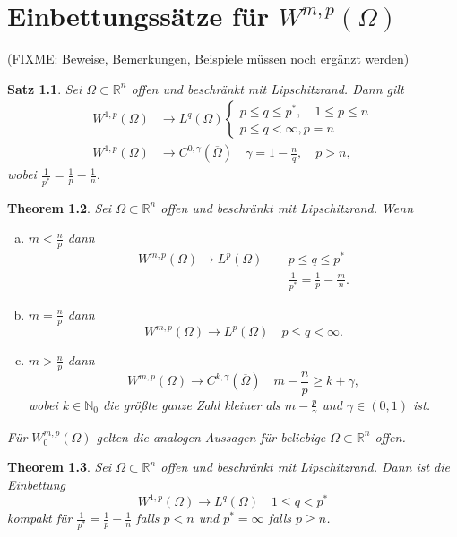 \documentclass[
paper=a4,
bibtotocnumbered,
liststotocnumbered,
tablecaptionabove,
pointlessnumbers,
twoside,
openright,
10pt
]
{report}
\newtheorem{thm}{Theorem}[chapter]
\newtheorem{satz}[thm]{Satz}
\theoremstyle{definition}
\numberwithin{equation}{chapter}
\begin{document}
\chapter{Einbettungssätze für $W^{m,p}(\Omega)$} (FIXME: Beweise, Bemerkungen, Beispiele müssen noch ergänzt werden)
\begin{satz} Sei $\Omega \subset \mathbb R^n$ offen und beschränkt mit Lipschitzrand. Dann gilt
\begin{align*}
W^{1,p}(\Omega) &\to L^q(\Omega) \begin{cases} p \le q \le p^*, \quad 1 \le p\le n\\  p \le q <\infty, p =n \end{cases}\\
W^{1,p}(\Omega) &\to C^{0,\gamma}(\overline{\Omega}) \quad \gamma = 1- \frac{n}{q}, \quad p >n,
\end{align*}
wobei $\frac{1}{p^*}= \frac{1}{p}-\frac{1}{n}$.
\end{satz}

\begin{thm}
Sei $\Omega \subset \mathbb R^n$ offen und beschränkt mit Lipschitzrand. Wenn
\begin{enumerate}[a)]
\item $m<\frac{n}{p}$ dann
\begin{align*}
W^{m,p}(\Omega) \to L^p(\Omega)&\ \quad p\le q \le p^*\\
&\ \quad \frac{1}{p^*} = \frac{1}{p} - \frac{m}{n}.
\end{align*}
\item $m= \frac{n}{p}$ dann
\begin{equation}
W^{m,p}(\Omega) \to L^p(\Omega) \quad p \le q <\infty.
\end{equation}
\item $m>\frac{n}{p}$ dann
\begin{equation}
W^{m,p}(\Omega) \to C^{k,\gamma}(\overline{\Omega}) \quad m- \frac{n}{p} \ge k + \gamma,
\end{equation}
wobei $k \in \mathbb N_0$ die größte ganze Zahl kleiner als $m- \frac{p}{\gamma}$ und $\gamma \in (0,1)$ ist.
\end{enumerate} 
Für $W_0^{m,p}(\Omega)$ gelten die analogen Aussagen für beliebige $\Omega \subset \mathbb R^n$ offen.
\end{thm}

\begin{thm}
Sei $\Omega \subset \mathbb R^n$ offen und beschränkt mit Lipschitzrand. Dann ist die Einbettung
\begin{equation}
W^{1,p}(\Omega) \to L^q(\Omega) \quad 1\le q < p^*
\end{equation}
kompakt für $\frac{1}{p^*}= \frac{1}{p} - \frac{1}{n}$ falls $p<n$ und $p^*=\infty$ falls $p \ge n$.
\end{thm}
\end{document}
